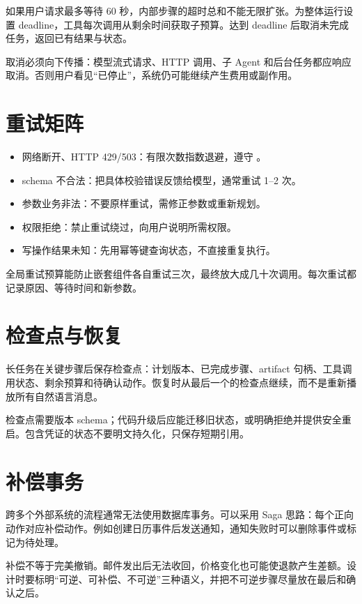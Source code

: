 如果用户请求最多等待 60 秒，内部步骤的超时总和不能无限扩张。为整体运行设置 deadline，工具每次调用从剩余时间获取子预算。达到 deadline 后取消未完成任务，返回已有结果与状态。

取消必须向下传播：模型流式请求、HTTP 调用、子 Agent 和后台任务都应响应取消。否则用户看见“已停止”，系统仍可能继续产生费用或副作用。

\section{重试矩阵}

\begin{itemize}
  \item 网络断开、HTTP 429/503：有限次数指数退避，遵守 。
  \item schema 不合法：把具体校验错误反馈给模型，通常重试 1--2 次。
  \item 参数业务非法：不要原样重试，需修正参数或重新规划。
  \item 权限拒绝：禁止重试绕过，向用户说明所需权限。
  \item 写操作结果未知：先用幂等键查询状态，不直接重复执行。
\end{itemize}

全局重试预算能防止嵌套组件各自重试三次，最终放大成几十次调用。每次重试都记录原因、等待时间和新参数。

\section{检查点与恢复}

长任务在关键步骤后保存检查点：计划版本、已完成步骤、artifact 句柄、工具调用状态、剩余预算和待确认动作。恢复时从最后一个的检查点继续，而不是重新播放所有自然语言消息。

检查点需要版本 schema；代码升级后应能迁移旧状态，或明确拒绝并提供安全重启。包含凭证的状态不要明文持久化，只保存短期引用。

\section{补偿事务}

跨多个外部系统的流程通常无法使用数据库事务。可以采用 Saga 思路：每个正向动作对应补偿动作。例如创建日历事件后发送通知，通知失败时可以删除事件或标记为待处理。

补偿不等于完美撤销。邮件发出后无法收回，价格变化也可能使退款产生差额。设计时要标明“可逆、可补偿、不可逆”三种语义，并把不可逆步骤尽量放在最后和确认之后。

